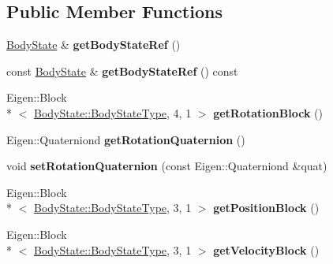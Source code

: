 \subsection*{Public Member Functions}
\begin{DoxyCompactItemize}
\item 
\hypertarget{class_filter_state_a931d62079a89ceacc6e3f62cad16fe77}{\hyperlink{class_body_state}{Body\-State} \& {\bfseries get\-Body\-State\-Ref} ()}\label{class_filter_state_a931d62079a89ceacc6e3f62cad16fe77}

\item 
\hypertarget{class_filter_state_af7a4b70d8985b4552f4ed8e5d36409e3}{const \hyperlink{class_body_state}{Body\-State} \& {\bfseries get\-Body\-State\-Ref} () const }\label{class_filter_state_af7a4b70d8985b4552f4ed8e5d36409e3}

\item 
\hypertarget{class_filter_state_a0fb9693aac0a091bbcc1555b44902570}{Eigen\-::\-Block\\*
$<$ \hyperlink{class_body_state_ac95355c4974335a6f69da770d2de30e0}{Body\-State\-::\-Body\-State\-Type}, 4, 1 $>$ {\bfseries get\-Rotation\-Block} ()}\label{class_filter_state_a0fb9693aac0a091bbcc1555b44902570}

\item 
\hypertarget{class_filter_state_a5f61beb08bf43811cebea645c80949ac}{Eigen\-::\-Quaterniond {\bfseries get\-Rotation\-Quaternion} ()}\label{class_filter_state_a5f61beb08bf43811cebea645c80949ac}

\item 
\hypertarget{class_filter_state_ab2a6e477d01da9521267781a73757838}{void {\bfseries set\-Rotation\-Quaternion} (const Eigen\-::\-Quaterniond \&quat)}\label{class_filter_state_ab2a6e477d01da9521267781a73757838}

\item 
\hypertarget{class_filter_state_a93091ee18e0421b6b99f6bfe039199d6}{Eigen\-::\-Block\\*
$<$ \hyperlink{class_body_state_ac95355c4974335a6f69da770d2de30e0}{Body\-State\-::\-Body\-State\-Type}, 3, 1 $>$ {\bfseries get\-Position\-Block} ()}\label{class_filter_state_a93091ee18e0421b6b99f6bfe039199d6}

\item 
\hypertarget{class_filter_state_a1b8b9f3985ea35ba0f9f4f273ae8c1f2}{Eigen\-::\-Block\\*
$<$ \hyperlink{class_body_state_ac95355c4974335a6f69da770d2de30e0}{Body\-State\-::\-Body\-State\-Type}, 3, 1 $>$ {\bfseries get\-Velocity\-Block} ()}\label{class_filter_state_a1b8b9f3985ea35ba0f9f4f273ae8c1f2}


\end{DoxyCompactItemize}
